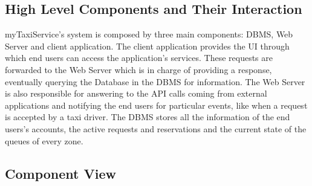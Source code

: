 \documentclass{article}
\begin{document}
\subsection{High Level Components and Their Interaction}
myTaxiService's system is composed by three main components: DBMS, Web Server and client application. The client application provides the UI through which end users can access the application's services. These requests are forwarded to the Web Server which is in charge of providing a response, eventually querying the Database in the DBMS for information. The Web Server is also responsible for answering to the API calls coming from external applications and notifying the end users for particular events, like when a request is accepted by a taxi driver. The DBMS stores all the information of the end users's accounts, the active requests and reservations and the current state of the queues of every zone. %
\subsection{Component View}
\begin{figure}[H]
\end{figure}
\end{document}
